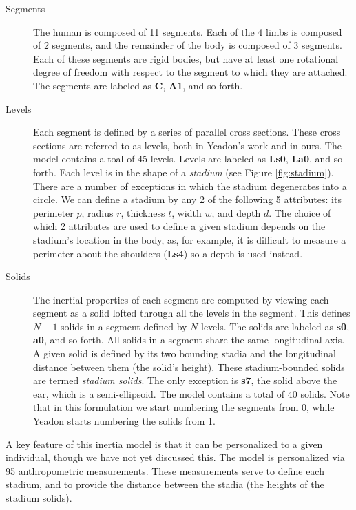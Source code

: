 \documentclass[10pt]{article}
\begin{document}
\begin{description}
    \item[Segments]
        The human is composed of 11 segments. Each of the 4 limbs is
        composed of 2 segments, and the remainder of the body is composed of 3
        segments. Each of these segments are rigid bodies, but have at least
        one rotational degree of freedom with respect to the segment to which
        they are attached.  The segments are labeled as \textbf{C},
        \textbf{A1}, and so forth.
    \item[Levels]
        Each segment is defined by a series of parallel cross sections.
        These cross sections are referred to as levels, both in
        Yeadon's work and in ours. The model contains a toal of 45 levels.
        Levels are labeled as \textbf{Ls0}, \textbf{La0}, and so forth.  Each
        level is in the shape of a \emph{stadium} (see Figure
        \ref{fig:stadium}). There are a number of exceptions in which the
        stadium degenerates into a circle. We can define a stadium by any 2 of
        the following 5 attributes: its perimeter $p$, radius $r$, thickness
        $t$, width $w$, and depth $d$.  The choice of which 2 attributes are
        used to define a given stadium depends on the stadium's location in the
        body, as, for example, it is difficult to measure a perimeter about the
        shoulders (\textbf{Ls4}) so a depth is used instead.
    \item[Solids]
        The inertial properties of each segment are computed by viewing each
        segment as a solid lofted through all the levels in the segment. This
        defines $N-1$ solids in a segment defined by $N$ levels. The solids are
        labeled as \textbf{s0}, \textbf{a0}, and so forth. All solids in a
        segment share the same longitudinal axis. A given solid is
        defined by its two bounding stadia and the longitudinal distance
        between them (the solid's height). These stadium-bounded solids are
        termed \emph{stadium solids}. The only exception is \textbf{s7}, the
        solid above the ear, which is a semi-ellipsoid. The model contains a
        total of 40 solids.  Note that in this formulation we start numbering
        the segments from 0, while Yeadon starts numbering the solids from 1.
\end{description}

A key feature of this inertia model is that it can be personalized to a given
individual, though we have not yet discussed this. The model is
personalized via 95 anthropometric measurements. These measurements serve to
define each stadium, and to provide the distance between the stadia (the
heights of the stadium solids).
\end{document}
